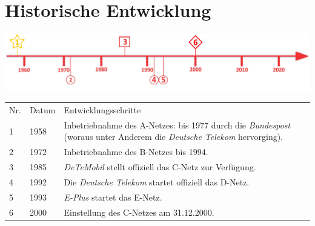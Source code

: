 \section*{Historische Entwicklung}
\includegraphics[width=\textwidth]{Kapitel/C-Netz/Grafiken/Zeitstrahl}
\par
\noindent
{}
\begin{tabular}{p{0.5 cm}p{1.5 cm}p{15.55 cm}}
	Nr. & Datum & Entwicklungsschritte~\cite{c-netz.7}\\
	1 & 1958 & Inbetriebnahme des A-Netzes: bis 1977 durch die \textit{Bundespost} (woraus unter Anderem die \textit{Deutsche Telekom} hervorging).\\
	2 & 1972 & Inbetriebnahme des B-Netzes bis 1994. \\
	3 & 1985 & \textit{DeTeMobil} stellt offiziell das C-Netz zur Verfügung.\\
	4 & 1992 & Die \textit{Deutsche Telekom} startet offiziell das D-Netz.\\
	5 & 1993 & \textit{E-Plus} startet das E-Netz.\\
	6 & 2000 & Einstellung des C-Netzes am 31.12.2000.
\end{tabular}
\par
